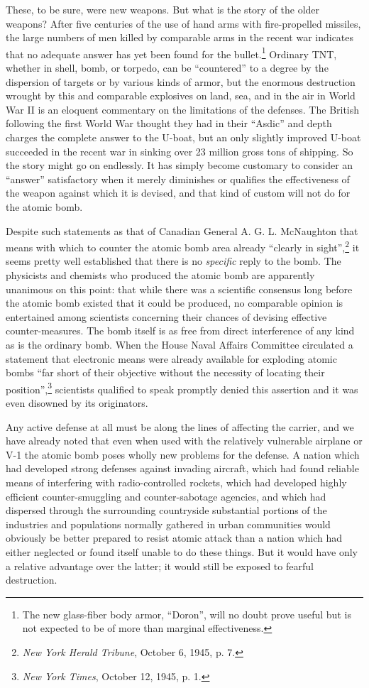 These, to be sure, were new weapons. But what is the story of the older weapons? After five centuries of the use of hand arms with fire-propelled missiles, the large numbers of men killed by comparable arms in the recent war indicates that no adequate answer has yet been found for the bullet.\footnote{The new glass-fiber body armor, ``Doron'', will no doubt prove useful but is not expected to be of more than marginal effectiveness.} Ordinary TNT, whether in shell, bomb, or torpedo, can be ``countered'' to a degree by the dispersion of targets or by various kinds of armor, but the enormous destruction wrought by this and comparable explosives on land, sea, and in the air in World War II is an eloquent commentary on the limitations of the defenses. The British following the first World War thought they had in their ``Asdic'' and depth charges the complete answer to the U-boat, but an only slightly improved U-boat succeeded in the recent war in sinking over 23 million gross tons of shipping. So the story might go on endlessly. It has simply become customary to consider an ``answer'' satisfactory when it merely diminishes or qualifies the effectiveness of the weapon against which it is devised, and that kind of custom will not do for the atomic bomb.

Despite such statements as that of Canadian General A. G. L. McNaughton that means with which to counter the atomic bomb area already ``clearly in sight'',\footnote{\textit{New York Herald Tribune}, October 6, 1945, p. 7.} it seems pretty well established that there is no \emph{specific} reply to the bomb. The physicists and chemists who produced the atomic bomb are apparently unanimous on this point: that while there was a scientific consensus long before the atomic bomb existed that it could be produced, no comparable opinion is entertained among scientists concerning their chances of devising effective counter-measures. The bomb itself is as free from direct interference of any kind as is the ordinary bomb. When the House Naval Affairs Committee circulated a statement that electronic means were already available for exploding atomic bombs ``far short of their objective without the necessity of locating their position'',\footnote{\textit{New York Times}, October 12, 1945, p. 1.} scientists qualified to speak promptly denied this assertion and it was even disowned by its originators.

Any active defense at all must be along the lines of affecting the carrier, and we have already noted that even when used with the relatively vulnerable airplane or V-1 the atomic bomb poses wholly new problems for the defense. A nation which had developed strong defenses against invading aircraft, which had found reliable means of interfering with radio-controlled rockets, which had developed highly efficient counter-smuggling and counter-sabotage agencies, and which had dispersed through the surrounding countryside substantial portions of the industries and populations normally gathered in urban communities would obviously be better prepared to resist atomic attack than a nation which had either neglected or found itself unable to do these things. But it would have only a relative advantage over the latter; it would still be exposed to fearful destruction.

